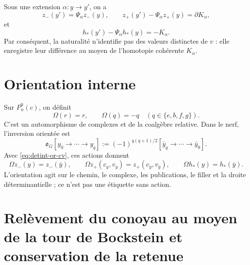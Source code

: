 Sous une extension \(\alpha:y\to y'\), on a
\begin{equation}\label{eq:detint-z-natural}
 z_-(y')=\Psi_\alpha z_-(y),
 \qquad
 z_+(y')-\Psi_\alpha z_+(y)=\partial K_\alpha,
\end{equation}
et
\begin{equation}\label{eq:detint-h-natural}
 h_*(y')-\Psi_\alpha h_*(y)=-K_\alpha.
\end{equation}
Par conséquent, la naturalité n'identifie pas des valeurs distinctes de \(v\) : elle enregistre
leur différence au moyen de l'homotopie cohérente \(K_\alpha\).

\section{Orientation interne}

Sur \(P_n^0(c)\), on définit
\begin{equation}\label{eq:detint-omega-p}
 \Omega(r)=r,
 \qquad
 \Omega(q)=-q\quad(q\in\{e,b,f,g\}).
\end{equation}
C'est un automorphisme de complexes et de la coalgèbre relative. Dans le nerf,
l'inversion orientée est
\begin{equation}\label{eq:detint-omega-g}
 \mathfrak o_G[y_0\to\cdots\to y_q]
 :=(-1)^{q(q+1)/2}
 [\bar y_q\to\cdots\to\bar y_0].
\end{equation}
Avec \eqref{eq:detint-or-cv}, ces actions donnent
\begin{equation}\label{eq:detint-or-z-h}
 \Omega z_-(y)=z_-(\bar y),
 \qquad
 \Omega z_+(c_y,v_y)=z_+(c_{\bar y},v_{\bar y}),
 \qquad
 \Omega h_*(y)=h_*(\bar y).
\end{equation}
L'orientation agit sur le chemin, le complexe, les publications, le filler et la droite
déterminantielle ; ce n'est pas une étiquette sans action.

\fi
\section{Relèvement du conoyau au moyen de la tour de Bockstein et conservation de la retenue}
\label{sec:detint-terminal}


